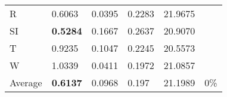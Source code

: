 \documentclass[11pt, a4paper]{article}
\begin{document}
\begin{table}[H]
\begin{tabular}{llllll}
R                                & 0.6063                            & 0.0395                            & 0.2283                               & 21.9675                                     &                                   \\
SI                        & \textbf{0.5284}                   & 0.1667                            & 0.2637                               & 20.9070                                     &                                   \\
T                              & 0.9235                            & 0.1047                            & 0.2245                               & 20.5573                                     &                                   \\
W                             & 1.0339                            & 0.0411                            & 0.1972                               & 21.0857                                     &                                   \\ \hline
Average                               & \textbf{0.6137}                   & 0.0968                            & 0.197                                & 21.1989                                     & 0\%
\end{tabular}
\end{table}
\end{document}
